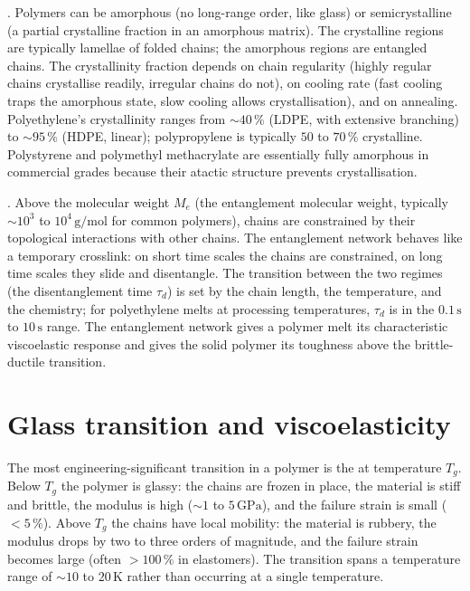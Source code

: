 . Polymers can be amorphous (no long-range
order, like glass) or semicrystalline (a partial crystalline fraction
in an amorphous matrix). The crystalline regions are typically
lamellae of folded chains; the amorphous regions are entangled
chains. The crystallinity fraction depends on chain regularity
(highly regular chains crystallise readily, irregular chains do not),
on cooling rate (fast cooling traps the amorphous state, slow cooling
allows crystallisation), and on annealing. Polyethylene's
crystallinity ranges from $\sim 40\,\%$ (LDPE, with extensive
branching) to $\sim 95\,\%$ (HDPE, linear); polypropylene is typically
$50$ to $70\,\%$ crystalline. Polystyrene and polymethyl methacrylate
are essentially fully amorphous in commercial grades because their
atactic structure prevents crystallisation.

. Above the molecular weight
$M_e$ (the entanglement molecular weight, typically $\sim 10^3$ to
$10^4\,\text{g}/\text{mol}$ for common polymers), chains are
constrained by their topological interactions with other chains. The
entanglement network behaves like a temporary crosslink: on short
time scales the chains are constrained, on long time scales they
slide and disentangle. The transition between the two regimes (the
disentanglement time $\tau_d$) is set by the chain length, the
temperature, and the chemistry; for polyethylene melts at processing
temperatures, $\tau_d$ is in the $0.1\,\si{\second}$ to $10\,
\si{\second}$ range. The entanglement network gives a polymer melt
its characteristic viscoelastic response and gives the solid polymer
its toughness above the brittle-ductile transition.

\section{Glass transition and viscoelasticity}

The most engineering-significant transition in a polymer is the
 at temperature $T_g$. Below $T_g$ the
polymer is glassy: the chains are frozen in place, the material is
stiff and brittle, the modulus is high ($\sim 1$ to $5\,\text{GPa}$),
and the failure strain is small ($< 5\,\%$). Above $T_g$ the chains
have local mobility: the material is rubbery, the modulus drops by
two to three orders of magnitude, and the failure strain becomes
large (often $> 100\,\%$ in elastomers). The transition spans a
temperature range of $\sim 10$ to $20\,\si{\kelvin}$ rather than
occurring at a single temperature.

